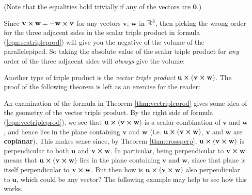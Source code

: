 
\par\noindent(Note that the equalities hold trivially if any of the vectors are $\mathbf{0}$.)\smallskip

Since $\mathbf{v} \bm{\times} \mathbf{w} = -\mathbf{w} \bm{\times} \mathbf{v}$ for any vectors $\mathbf{v}$, $\mathbf{w}$
in $\mathbb{R}^{3}$, then picking the wrong order for the three adjacent sides in the scalar triple product in formula
(\ref{eqn:scatripleprod}) will give you the negative of the volume of the parallelepiped. So
taking the absolute value of the scalar triple product for \emph{any} order of the three adjacent sides will
\emph{always} give the volume:


Another type of triple product is the \emph{vector triple product}
$\mathbf{u} \bm{\times} (\mathbf{v} \bm{\times} \mathbf{w})$. The proof of the following theorem is left as an
exercise for the reader:

An examination of the formula in Theorem \ref{thm:vectripleprod} gives some idea of the geometry of the vector triple
product. By the right side of formula (\ref{eqn:vectripleprod}), we see that
$\mathbf{u} \bm{\times} (\mathbf{v} \bm{\times} \mathbf{w})$ is a scalar combination of $\mathbf{v}$ and $\mathbf{w}$, and
hence lies in the plane containing $\mathbf{v}$ and $\mathbf{w}$ (i.e.
$\mathbf{u} \bm{\times} (\mathbf{v} \bm{\times} \mathbf{w})$, $\mathbf{v}$ and $\mathbf{w}$ are
\textbf{coplanar}).
This makes sense since, by Theorem \ref{thm:crossperp},
$\mathbf{u} \bm{\times} (\mathbf{v} \bm{\times} \mathbf{w})$ is perpendicular to both $\mathbf{u}$ and
$\mathbf{v} \bm{\times} \mathbf{w}$. In particular, being perpendicular to $\mathbf{v} \bm{\times} \mathbf{w}$ means
that $\mathbf{u} \bm{\times} (\mathbf{v} \bm{\times} \mathbf{w})$ lies in the plane containing $\mathbf{v}$ and
$\mathbf{w}$, since that plane is itself perpendicular to $\mathbf{v} \bm{\times} \mathbf{w}$. But then how is
$\mathbf{u} \bm{\times} (\mathbf{v} \bm{\times} \mathbf{w})$ also perpendicular to $\mathbf{u}$, which could be any
vector? The following example may help to see how this works.

